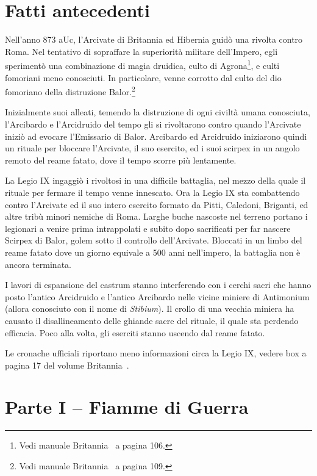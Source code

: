 \documentclass[11.5pt,twocolumn]{article}
\begin{document}
\section*{Fatti antecedenti}
Nell'anno 873 aUc, l'Arcivate di Britannia ed Hibernia guid\`{o} una rivolta contro Roma.
Nel tentativo di sopraffare la superiorit\`{a} militare dell'Impero, egli speriment\`{o} una combinazione di magia druidica, culto di Agrona\footnote{Vedi manuale Britannia~\cite{britannia_en} a pagina 106.}, e culti fomoriani meno conosciuti.
In particolare, venne corrotto dal culto del dio fomoriano della distruzione Balor.\footnote{Vedi manuale Britannia~\cite{britannia_en} a pagina 109.}

Inizialmente suoi alleati, temendo la distruzione di ogni civilt\`{a} umana conosciuta, l'Arcibardo e l'Arcidruido del tempo gli si rivoltarono contro quando l'Arcivate inizi\`{o} ad evocare l'Emissario di Balor.
Arcibardo ed Arcidruido iniziarono quindi un rituale per bloccare l'Arcivate, il suo esercito, ed i suoi scirpex in un angolo remoto del reame fatato, dove il tempo scorre pi\`{u} lentamente.

La Legio IX ingaggi\`{o} i rivoltosi in una difficile battaglia, nel mezzo della quale il rituale per fermare il tempo venne innescato.
Ora la Legio IX sta combattendo contro l'Arcivate ed il suo intero esercito formato da Pitti, Caledoni, Briganti, ed altre trib\`{u} minori nemiche di Roma.
Larghe buche nascoste nel terreno portano i legionari a venire prima intrappolati e subito dopo sacrificati per far nascere Scirpex di Balor, golem sotto il controllo dell'Arcivate.
Bloccati in un limbo del reame fatato dove un giorno equivale a 500 anni nell'impero, la battaglia non \`{e} ancora terminata.

I lavori di espansione del castrum stanno interferendo con i cerchi sacri che hanno posto l'antico Arcidruido e l'antico Arcibardo nelle vicine miniere di Antimonium (allora conosciuto con il nome di \emph{Stibium}).
Il crollo di una vecchia miniera ha causato il disallineamento delle ghiande sacre del rituale, il quale sta perdendo efficacia.
Poco alla volta, gli eserciti stanno uscendo dal reame fatato.

Le cronache ufficiali riportano meno informazioni circa la Legio IX, vedere box a pagina 17 del volume Britannia~\cite{britannia_en}.

\section*{Parte I -- Fiamme di Guerra}
\end{document}
